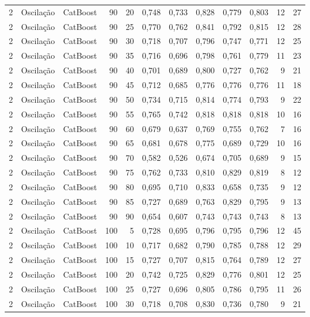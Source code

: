 \begin{longtable}{@{}rllrrrrrrrrr@{}}
2 & Oscilação & CatBoost & 90 & 20 & 0,748 & 0,733 & 0,828 & 0,779 & 0,803 & 12 & 27 \\
2 & Oscilação & CatBoost & 90 & 25 & 0,770 & 0,762 & 0,841 & 0,792 & 0,815 & 12 & 28 \\
2 & Oscilação & CatBoost & 90 & 30 & 0,718 & 0,707 & 0,796 & 0,747 & 0,771 & 12 & 25 \\
2 & Oscilação & CatBoost & 90 & 35 & 0,716 & 0,696 & 0,798 & 0,761 & 0,779 & 11 & 23 \\
2 & Oscilação & CatBoost & 90 & 40 & 0,701 & 0,689 & 0,800 & 0,727 & 0,762 & 9 & 21 \\
2 & Oscilação & CatBoost & 90 & 45 & 0,712 & 0,685 & 0,776 & 0,776 & 0,776 & 11 & 18 \\
2 & Oscilação & CatBoost & 90 & 50 & 0,734 & 0,715 & 0,814 & 0,774 & 0,793 & 9 & 22 \\
2 & Oscilação & CatBoost & 90 & 55 & 0,765 & 0,742 & 0,818 & 0,818 & 0,818 & 10 & 16 \\
2 & Oscilação & CatBoost & 90 & 60 & 0,679 & 0,637 & 0,769 & 0,755 & 0,762 & 7 & 16 \\
2 & Oscilação & CatBoost & 90 & 65 & 0,681 & 0,678 & 0,775 & 0,689 & 0,729 & 10 & 16 \\
2 & Oscilação & CatBoost & 90 & 70 & 0,582 & 0,526 & 0,674 & 0,705 & 0,689 & 9 & 15 \\
2 & Oscilação & CatBoost & 90 & 75 & 0,762 & 0,733 & 0,810 & 0,829 & 0,819 & 8 & 12 \\
2 & Oscilação & CatBoost & 90 & 80 & 0,695 & 0,710 & 0,833 & 0,658 & 0,735 & 9 & 12 \\
2 & Oscilação & CatBoost & 90 & 85 & 0,727 & 0,689 & 0,763 & 0,829 & 0,795 & 9 & 13 \\
2 & Oscilação & CatBoost & 90 & 90 & 0,654 & 0,607 & 0,743 & 0,743 & 0,743 & 8 & 13 \\
2 & Oscilação & CatBoost & 100 & 5 & 0,728 & 0,695 & 0,796 & 0,795 & 0,796 & 12 & 45 \\
2 & Oscilação & CatBoost & 100 & 10 & 0,717 & 0,682 & 0,790 & 0,785 & 0,788 & 12 & 29 \\
2 & Oscilação & CatBoost & 100 & 15 & 0,727 & 0,707 & 0,815 & 0,764 & 0,789 & 12 & 27 \\
2 & Oscilação & CatBoost & 100 & 20 & 0,742 & 0,725 & 0,829 & 0,776 & 0,801 & 12 & 25 \\
2 & Oscilação & CatBoost & 100 & 25 & 0,727 & 0,696 & 0,805 & 0,786 & 0,795 & 11 & 26 \\
2 & Oscilação & CatBoost & 100 & 30 & 0,718 & 0,708 & 0,830 & 0,736 & 0,780 & 9 & 21 \\

\end{longtable}
